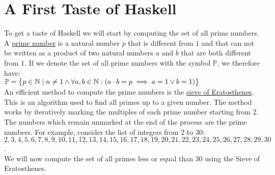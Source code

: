 \section{A First Taste of Haskell}
To get a taste of Haskell we will start by computing the set of all prime numbers.
A \href{https://en.wikipedia.org/wiki/Prime_number}{prime number} is a natural number $p$ that is different from $1$
and that can not be written as a product of two natural numbers $a$ and $b$ that are both different from $1$.  If
we denote the set of all prime numbers with the symbol $\mathbb{P}$, we therefore have:
\\[0.2cm]
\hspace*{1.3cm}
$\displaystyle \mathbb{P} = \bigl\{ p \in \mathbb{N} \mid n \not= 1 \wedge \forall a, b \in \mathbb{N}:(a \cdot b = p
\implies a = 1 \vee b = 1) \bigr\}$
\\[0.2cm]
An efficient method to compute the prime numbers is the
\href{https://en.wikipedia.org/wiki/Sieve_of_Eratosthenes}{sieve of Eratosthenes}.
This is an algorithm used to find all primes up to a given number. The method works by iteratively marking the
multiples of each prime number starting from 2. The numbers which remain unmarked at the end of the process are
the prime numbers.  For example, consider the list of integers from 2 to 30:
\\[0.2cm]
\hspace*{0.3cm}
$2, 3, 4, 5, 6, 7, 8, 9, 10, 11, 12, 13, 14, 15, 16, 17, 18, 19, 20, 21, 22, 23, 24, 25, 26, 27, 28, 29, 30$.
\\[0.2cm]
We will now compute the set of all primes less or equal than 30 using the Sieve of Eratosthenes.
